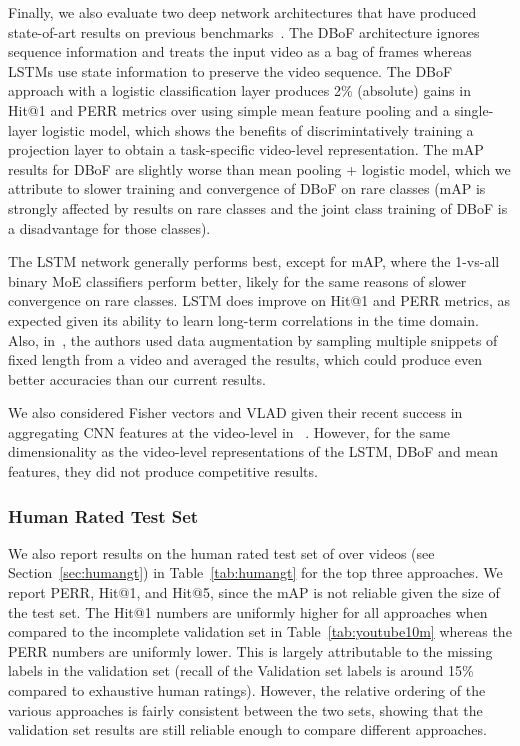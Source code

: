 \documentclass{sig-alternate-05-2015}
\begin{document}
Finally, we also evaluate two deep network architectures that have produced state-of-art results on previous benchmarks~\cite{beyond}. The DBoF architecture ignores sequence information and treats the input video as a bag of frames whereas LSTMs use state information to preserve the video sequence.
The DBoF approach with a logistic classification layer produces 2\% (absolute) gains in
Hit@1 and PERR metrics over using simple mean feature pooling and a single-layer
logistic model, which shows the benefits of discrimintatively training a
projection layer to obtain a task-specific video-level representation. The mAP
results for DBoF are slightly worse than mean pooling + logistic model, which we
attribute to slower training and convergence of DBoF on rare classes (mAP is strongly affected
by results on rare classes and the joint class training of DBoF is a disadvantage
for those classes).


The LSTM network generally performs best, except for mAP, where the 1-vs-all
binary MoE classifiers perform better, likely for the same reasons of slower
convergence on rare classes. LSTM does improve on Hit@1 and PERR metrics, as
expected given its ability to learn long-term correlations in the time domain.
Also, in~\cite{beyond}, the authors used data augmentation by sampling multiple
snippets of fixed length from a video and averaged the results, which could
produce even better accuracies than our current results.

We also considered Fisher vectors and VLAD given their recent success in aggregating CNN features at the video-level in
~\cite{xu2015}. However, for the same dimensionality as the video-level representations of the LSTM, DBoF and mean features,
they did not produce competitive results.


\subsubsection{Human Rated Test Set}
We also report results on the human rated test set of over  videos (see Section~\ref{sec:humangt}) in Table~\ref{tab:humangt}
for the top three approaches. We report PERR, Hit@1, and Hit@5, since the mAP is not reliable given the size of the test set. The
 Hit@1 numbers are uniformly higher for all approaches when compared to the incomplete validation set in Table~\ref{tab:youtube10m}
whereas the PERR numbers are uniformly lower. This is largely attributable to the missing labels in the validation set
(recall of the Validation set labels is around 15\% compared to exhaustive human ratings).
However, the relative ordering of the various approaches is fairly consistent between the two sets, showing that the
validation set results are still reliable enough to compare different approaches.
\end{document}
